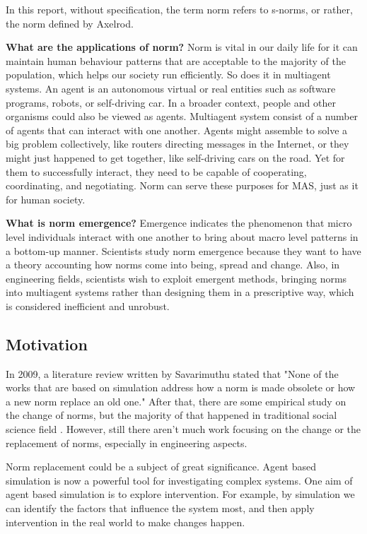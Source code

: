 \documentclass[12pt]{extarticle}
\begin{document}
In this report, without specification, the term norm refers to s-norms, or rather, the norm defined by Axelrod.

\textbf{What are the applications of norm?} Norm is vital in our daily life for it can maintain human behaviour patterns that are acceptable to the majority of the population, which helps our society run efficiently. So does it in multiagent systems. An agent is an autonomous virtual or real entities such as software programs, robots, or self-driving car. In a broader context, people and other organisms could also be viewed as agents. Multiagent system consist of a number of agents that can interact with one another. Agents might assemble to solve a big problem collectively, like routers directing messages in the Internet, or they might just happened to get together, like self-driving cars on the road. Yet for them to successfully interact, they need to be capable of cooperating, coordinating, and negotiating. Norm can serve these purposes for MAS, just as it for human society.

\textbf{What is norm emergence?}
Emergence indicates the phenomenon that micro level individuals interact with one another to bring about macro level patterns in a bottom-up manner. Scientists study norm emergence because they want to have a theory accounting how norms come into being, spread and change. Also, in engineering fields, scientists wish to exploit emergent methods, bringing norms into multiagent systems rather than designing them in a prescriptive way, which is considered inefficient and unrobust.

\subsection{Motivation}
In 2009, a literature review written by Savarimuthu\cite{Savarimuthu2011} stated that "None of the works that are based on simulation address how a norm is made obsolete or how a new norm replace an old one." After that, there are some empirical study on the change of norms, but the majority of that happened in traditional social science field\cite{Gest2013} \cite{Sandholtz2019}. However, still there aren't much work focusing on the change or the replacement of norms, especially in engineering aspects. 

Norm replacement could be a subject of great significance. Agent based simulation is now a powerful tool for investigating complex systems. One aim of agent based simulation is to explore intervention. For example, by simulation we can identify the factors that influence the system most, and then apply intervention in the real world to make changes happen. 
\end{document}
